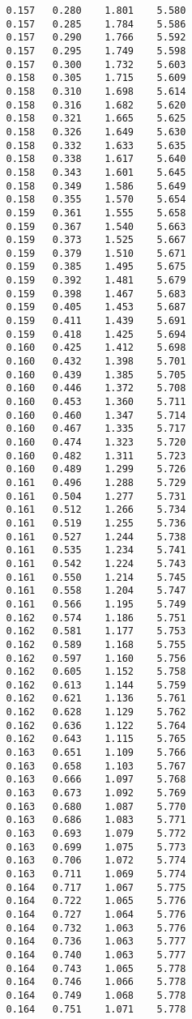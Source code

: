 \begin{verbatim}
   0.157   0.280    1.801    5.580
   0.157   0.285    1.784    5.586
   0.157   0.290    1.766    5.592
   0.157   0.295    1.749    5.598
   0.157   0.300    1.732    5.603
   0.158   0.305    1.715    5.609
   0.158   0.310    1.698    5.614
   0.158   0.316    1.682    5.620
   0.158   0.321    1.665    5.625
   0.158   0.326    1.649    5.630
   0.158   0.332    1.633    5.635
   0.158   0.338    1.617    5.640
   0.158   0.343    1.601    5.645
   0.158   0.349    1.586    5.649
   0.158   0.355    1.570    5.654
   0.159   0.361    1.555    5.658
   0.159   0.367    1.540    5.663
   0.159   0.373    1.525    5.667
   0.159   0.379    1.510    5.671
   0.159   0.385    1.495    5.675
   0.159   0.392    1.481    5.679
   0.159   0.398    1.467    5.683
   0.159   0.405    1.453    5.687
   0.159   0.411    1.439    5.691
   0.159   0.418    1.425    5.694
   0.160   0.425    1.412    5.698
   0.160   0.432    1.398    5.701
   0.160   0.439    1.385    5.705
   0.160   0.446    1.372    5.708
   0.160   0.453    1.360    5.711
   0.160   0.460    1.347    5.714
   0.160   0.467    1.335    5.717
   0.160   0.474    1.323    5.720
   0.160   0.482    1.311    5.723
   0.160   0.489    1.299    5.726
   0.161   0.496    1.288    5.729
   0.161   0.504    1.277    5.731
   0.161   0.512    1.266    5.734
   0.161   0.519    1.255    5.736
   0.161   0.527    1.244    5.738
   0.161   0.535    1.234    5.741
   0.161   0.542    1.224    5.743
   0.161   0.550    1.214    5.745
   0.161   0.558    1.204    5.747
   0.161   0.566    1.195    5.749
   0.162   0.574    1.186    5.751
   0.162   0.581    1.177    5.753
   0.162   0.589    1.168    5.755
   0.162   0.597    1.160    5.756
   0.162   0.605    1.152    5.758
   0.162   0.613    1.144    5.759
   0.162   0.621    1.136    5.761
   0.162   0.628    1.129    5.762
   0.162   0.636    1.122    5.764
   0.162   0.643    1.115    5.765
   0.163   0.651    1.109    5.766
   0.163   0.658    1.103    5.767
   0.163   0.666    1.097    5.768
   0.163   0.673    1.092    5.769
   0.163   0.680    1.087    5.770
   0.163   0.686    1.083    5.771
   0.163   0.693    1.079    5.772
   0.163   0.699    1.075    5.773
   0.163   0.706    1.072    5.774
   0.163   0.711    1.069    5.774
   0.164   0.717    1.067    5.775
   0.164   0.722    1.065    5.776
   0.164   0.727    1.064    5.776
   0.164   0.732    1.063    5.776
   0.164   0.736    1.063    5.777
   0.164   0.740    1.063    5.777
   0.164   0.743    1.065    5.778
   0.164   0.746    1.066    5.778
   0.164   0.749    1.068    5.778
   0.164   0.751    1.071    5.778

\end{verbatim}
